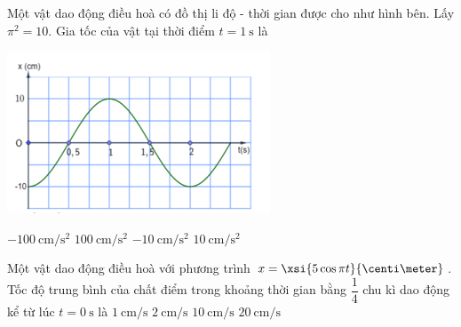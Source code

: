 \begin{ex}
Một vật dao động điều hoà có đồ thị li độ - thời gian được cho như hình bên. Lấy $\pi^2=10$. Gia tốc của vật tại thời điểm $t=\SI{1}{\second}$ là
\begin{center}
	\includegraphics[width=0.4\linewidth]{../figs/C1-Q-3}
\end{center}	
	\choice
	{\True $\SI{-100}{\centi\meter/\second^2}$}
	{$\SI{100}{\centi\meter/\second^2}$}
	{$\SI{-10}{\centi\meter/\second^2}$}
	{$\SI{10}{\centi\meter/\second^2}$}
\end{ex}
\begin{ex}
	Một vật dao động điều hoà với phương trình $x=\xsi{5\cos\pi t}{\centi\meter}$. Tốc độ trung bình của chất điểm trong khoảng thời gian bằng $\dfrac{1}{4}$ chu kì dao động kể từ lúc $t=\SI{0}{\second}$ là
	\choice
	{$\SI{1}{\centi\meter/\second}$}
	{$\SI{2}{\centi\meter/\second}$}
	{\True $\SI{10}{\centi\meter/\second}$}
	{$\SI{20}{\centi\meter/\second}$}
\end{ex}

